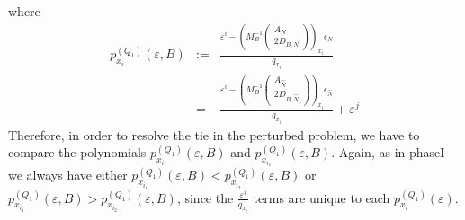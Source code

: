 \documentclass[a4paper]{article}
\begin{document}
where
\begin{eqnarray}
\label{def:p_x_i_Q_1}
p_{x_{i}}^{(Q_{1})}\left(\varepsilon, B\right) &:=&
  \frac{\varepsilon^{i} -
         \left(M_{B}^{-1}
           \left(\begin{array}{c}
                    A_{N}  \\
	            \hline
	            2D_{B, N}
	         \end{array}
	   \right)
         \right)_{x_{i}}\epsilon_{N}}{q_{x_{i}}} \\
  &=&
    \frac{\varepsilon^{i} -
         \left(M_{B}^{-1}
           \left(\begin{array}{c}
                    A_{\hat{N}}  \\
	            \hline
	            2D_{B, \hat{N}}
	         \end{array}
	   \right)
         \right)_{x_{i}}\epsilon_{\hat{N}}}{q_{x_{i}}}
	 + \varepsilon^{j}
\end{eqnarray}
Therefore, in order to resolve the tie in the perturbed problem, we have 
to compare the polynomials $p_{x_{i_{1}}}^{(Q_{1})}(\varepsilon, B)$ and
$p_{x_{i_{1}}}^{(Q_{1})}(\varepsilon, B)$.
Again, as in phaseI we always have either
$p_{x_{i_{1}}}^{(Q_{1})}\left(\varepsilon, B\right) <
p_{x_{i_{2}}}^{(Q_{1})}\left(\varepsilon, B\right)$ or
$p_{x_{i_{1}}}^{(Q_{1})}\left(\varepsilon, B\right) >
p_{x_{i_{2}}}^{(Q_{1})}\left(\varepsilon, B\right)$, since the
$\frac{\varepsilon^{i}}{q_{x_{i}}}$ terms are unique to each
$p_{x_{i}}^{(Q_{1})}(\varepsilon)$.
\end{document}
